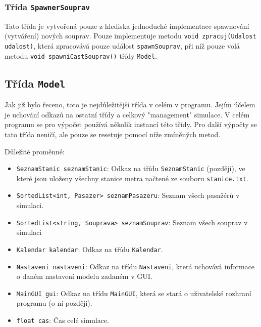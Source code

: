 \documentclass[12pt, a4paper]{article}
\begin{document}
\subsubsection{Třída \texttt{SpawnerSouprav}}
Tato třída je vytvořená pouze z hlediska jednoduché implementace spawnování (vytváření) nových souprav. Pouze implementuje metodu \texttt{void zpracuj(Udalost udalost)}, která zpracovává pouze událost \texttt{spawnSouprav}, při níž pouze volá metodu \texttt{void spawniCastSouprav()} třídy \texttt{Model}.

\subsection{Třída \texttt{Model}}
Jak již bylo řeceno, toto je nejdůležitější třída v celém v programu. Jejím účelem je uchování odkazů na ostatní třídy a celkový "management" simulace. V celém programu se pro výpočet používá několik instancí této třídy. Pro další výpočty se tato třída neničí, ale pouze se resetuje pomocí níže zmíněných metod.

Důležité proměnné:
\begin{itemize}
    \item \texttt{SeznamStanic seznamStanic}: Odkaz na třídu \texttt{SeznamStanic} (později), ve které jsou uloženy všechny stanice metra načtené ze souboru \texttt{stanice.txt}.
    \item \texttt{SortedList<int, Pasazer> seznamPasazeru}: Seznam všech pasažérů v simulaci.
    \item \texttt{SortedList<string, Souprava> seznamSouprav}: Seznam všech souprav v simulaci
    \item \texttt{Kalendar kalendar}: Odkaz na třídu \texttt{Kalendar}.
    \item \texttt{Nastaveni nastaveni}: Odkaz na třídu \texttt{Nastaveni}, která uchovává informace o daném nastavení modelu zadaném v GUI.
    \item \texttt{MainGUI gui}: Odkaz na třídu \texttt{MainGUI}, která se stará o uživatelské rozhraní programu (o ní později).
    \item \texttt{float cas}: Čas celé simulace.
\end{itemize}
\end{document}
